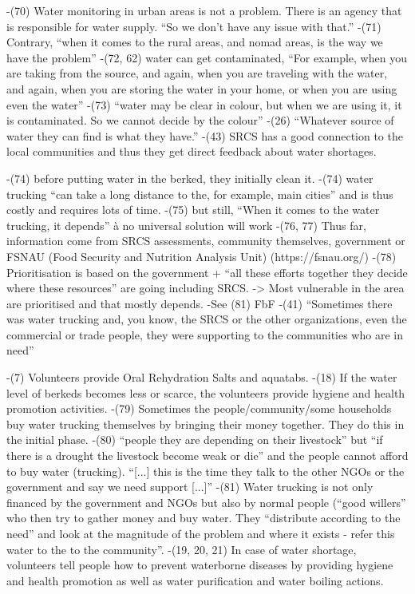 -(70) Water monitoring in urban areas is not a problem. There is an agency that is responsible for water supply. “So we don't have any issue with that.”
-(71) Contrary, “when it comes to the rural areas, and nomad areas, is the way we have the problem”
-(72, 62) water can get contaminated, “For example, when you are taking from the source, and again, when you are traveling with the water, and again, when you are storing the water in your home, or when you are using even the water”
-(73) “water may be clear in colour, but when we are using it, it is contaminated. So we cannot decide by the colour”
-(26) “Whatever source of water they can find is what they have.”
-(43) SRCS has a good connection to the local communities and thus they get direct feedback about water shortages.

-(74) before putting water in the berked, they initially clean it.
-(74) water trucking “can take a long distance to the, for example, main cities” and is thus costly and requires lots of time.
-(75) but still, “When it comes to the water trucking, it depends” à no universal solution will work
-(76, 77) Thus far, information come from SRCS assessments, community themselves, government or FSNAU (Food Security and Nutrition Analysis Unit) (https://fsnau.org/)
-(78) Prioritisation is based on the government + “all these efforts together they decide where these resources” are going including SRCS. -> Most vulnerable in the area are prioritised and that mostly depends.
-See (81) FbF
-(41) “Sometimes there was water trucking and, you know, the SRCS or the other organizations, even the commercial or trade people, they were supporting to the communities who are in need”

-(7) Volunteers provide Oral Rehydration Salts and aquatabs.
-(18) If the water level of berkeds becomes less or scarce, the volunteers provide hygiene and health promotion activities.
-(79) Sometimes the people/community/some households buy water trucking themselves by bringing their money together. They do this in the initial phase.
-(80) “people they are depending on their livestock” but “if there is a drought the livestock become weak or die” and the people cannot afford to buy water (trucking). “[...] this is the time they talk to the other NGOs or the government and say we need support [...]”
-(81) Water trucking is not only financed by the government and NGOs but also by normal people (“good willers” who then try to gather money and buy water. They “distribute according to the need” and look at the magnitude of the problem and where it exists - refer this water to the to the community”.
-(19, 20, 21) In case of water shortage, volunteers tell people how to prevent waterborne diseases by providing hygiene and health promotion as well as water purification and water boiling actions.




